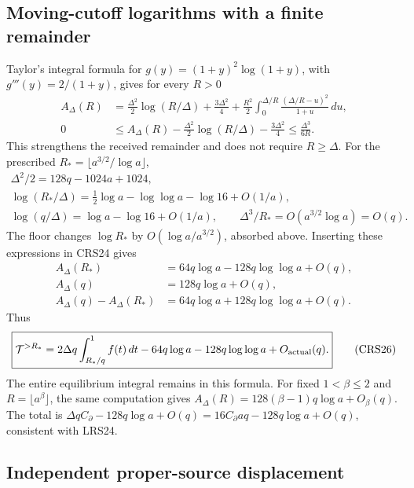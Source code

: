 \subsection{Moving-cutoff logarithms with a finite remainder}

Taylor's integral formula for $g(y)=(1+y)^2\log(1+y)$,
with $g'''(y)=2/(1+y)$, gives for every $R>0$
\[
\begin{split}
 A_\Delta(R)
 &=\tfrac{\Delta^2}{2}\log(R/\Delta)+\tfrac{3\Delta^2}{4}
  +\frac{R^2}{2}\int_0^{\Delta/R}
                         \frac{(\Delta/R-u)^2}{1+u}\,du,\\
 0&\le A_\Delta(R)-\tfrac{\Delta^2}{2}\log(R/\Delta)
                -\tfrac{3\Delta^2}{4}\le\frac{\Delta^3}{6R}.
\end{split}                                                    \tag{CRS24}
\]
This strengthens the received remainder and does not require $R\ge\Delta$.
For the prescribed $R_*=\lfloor a^{3/2}/\log a\rfloor$,
\[
\begin{gathered}
 \Delta^2/2=128q-1024a+1024,\\
 \log(R_*/\Delta)=\tfrac12\log a-\log\log a-\log16+O(1/a),\\
 \log(q/\Delta)=\log a-\log16+O(1/a),\qquad
 \Delta^3/R_*=O(a^{3/2}\log a)=O(q).
\end{gathered}
\]
The floor changes $\log R_*$ by $O(\log a/a^{3/2})$, absorbed
above. Inserting these expressions in CRS24 gives
\[
\begin{split}
 A_\Delta(R_*)&=64q\log a-128q\log\log a+O(q),\\
 A_\Delta(q)&=128q\log a+O(q),\\
 A_\Delta(q)-A_\Delta(R_*)&=64q\log a+128q\log\log a+O(q).
\end{split}                                                    \tag{CRS25}
\]
Thus
\[
 \boxed{\displaystyle
 \mathcal T^{>R_*}=2\Delta q\int_{R_*/q}^1 f(t)\,dt
   -64q\log a-128q\log\log a+O_{\rm actual}(q).}        \tag{CRS26}
\]
The entire equilibrium integral remains in this formula.
For fixed $1<\beta\le2$ and $R=\lfloor a^\beta\rfloor$,
the same computation gives
$A_\Delta(R)=128(\beta-1)q\log a+O_\beta(q)$.
The total is
$\Delta qC_\partial-128q\log a+O(q)
=16C_\partial aq-128q\log a+O(q)$, consistent with LRS24.

\subsection{Independent proper-source displacement}

